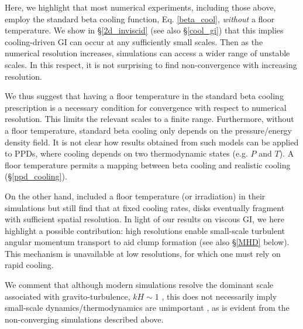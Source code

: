 Here, we highlight that most numerical experiments, including those
above, employ the standard beta cooling function, Eq. \ref{beta_cool},
\emph{without} a floor temperature. We show in \S\ref{2d_inviscid}
(see also \S\ref{cool_gi}) that this implies cooling-driven GI can
occur at any sufficiently small scales. Then as the numerical
resolution increases, simulations can access a wider range of unstable
scales.  %
In this respect, it is not surprising to find non-convergence with 
increasing resolution. %

We thus suggest that having a floor temperature in the standard beta
cooling prescription is a necessary condition for  
convergence with respect to numerical resolution. This limits the
relevant scales to a finite range.  %
Furthermore, without a floor temperature, standard beta cooling only
depends on the pressure/energy density field. It is not clear how
results obtained from such models can be applied to PPDs, where
cooling depends on two thermodynamic states (e.g. $P$ and
$T$). A floor temperature permits a mapping between beta
cooling and realistic cooling (\S\ref{ppd_cooling}). 

%


On the other hand, \cite{baehr15} included a floor temperature (or irradiation)
in their simulations but still find that at fixed cooling rates, disks
eventually fragment with sufficient spatial resolution.
In light of our results on viscous GI, 
we here highlight a possible contribution: %
high resolutions enable small-scale turbulent angular momentum transport 
to aid clump formation (see also \S\ref{MHD} below). 
This mechanism is unavailable at low resolutions, for which one must
rely on rapid cooling.  


We comment that although modern simulations resolve the dominant
scale associated with gravito-turbulence, $kH\sim 1$
\citep{cossins09}, this does not
necessarily imply small-scale dynamics/thermodynamics are unimportant 
\citep[especially for non-linear evolution, see][]{young15},  
as is evident from the non-converging simulations described above.   

